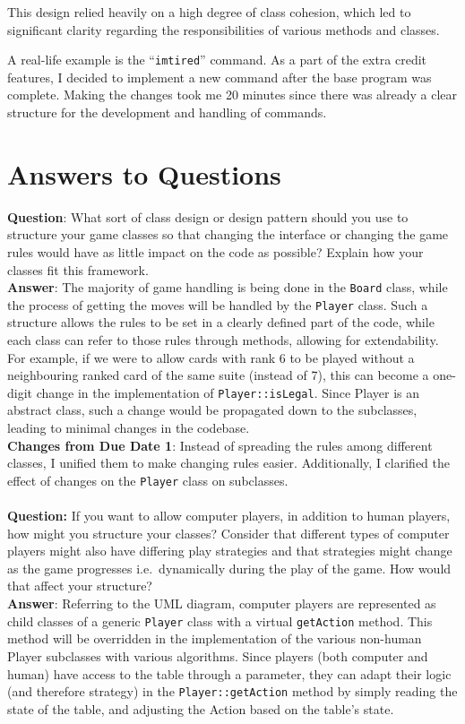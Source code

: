 \documentclass[12pt]{article}
\begin{document}
		This design relied heavily on a high degree of class cohesion, which led to significant clarity regarding the responsibilities of various methods and classes.

		A real-life example is the ``\texttt{imtired}'' command. As a part of the extra credit features, I decided to implement a new command after the base program was complete. Making the changes took me 20 minutes since there was already a clear structure for the development and handling of commands.
	\section{Answers to Questions}
		{\bf Question}: What sort of class design or design pattern should you use to structure your game classes so that changing the interface or changing the game rules would have as little impact on the code as possible? Explain how your classes fit this framework.\\
		{\bf Answer}: The majority of game handling is being done in the {\tt Board} class, while the process of getting the moves will be handled by the {\tt Player} class. Such a structure allows the rules to be set in a clearly defined part of the code, while each class can refer to those rules through methods, allowing for extendability. For example, if we were to allow cards with rank 6 to be played without a neighbouring ranked card of the same suite (instead of 7), this can become a one-digit change in the implementation of {\tt Player::isLegal}. Since Player is an abstract class, such a change would be propagated down to the subclasses, leading to minimal changes in the codebase.\\
		{\bf Changes from Due Date 1}: Instead of spreading the rules among different classes, I unified them to make changing rules easier. Additionally, I clarified the effect of changes on the \texttt{Player} class on subclasses.
		\\\\
		{\bf Question:} If you want to allow computer players, in addition to human players, how might you structure your classes? Consider that different types of computer players might also have differing play strategies and that strategies might change as the game progresses i.e.\ dynamically during the play of the game. How would that affect your structure?\\
		{\bf Answer}: Referring to the UML diagram, computer players are represented as child classes of a generic {\tt Player} class with a virtual {\tt getAction} method. This method will be overridden in the implementation of the various non-human Player subclasses with various algorithms. Since players (both computer and human) have access to the table through a parameter, they can adapt their logic (and therefore strategy) in the {\tt Player::getAction} method by simply reading the state of the table, and adjusting the Action based on the table's state.\\
\end{document}
